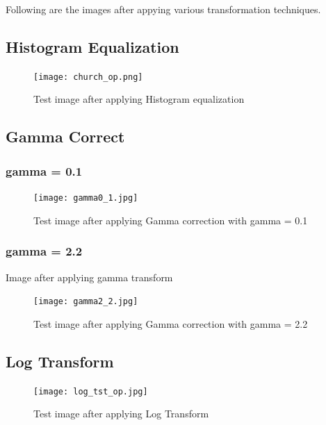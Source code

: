 \documentclass{article}
\begin{document}
Following are the images after appying various transformation techniques.
\subsection{Histogram Equalization}
\begin{figure}[htb]

\begin{minipage}[b]{1.0\linewidth}
  \centering
  \centerline{\texttt{[image: church\_op.png]}}
  \centerline{Test image after applying Histogram equalization}\medskip
\end{minipage}
%
\end{figure}


\subsection{Gamma Correct}
\subsubsection{gamma = 0.1}
\begin{figure}[htb]

\begin{minipage}[b]{1.0\linewidth}
  \centering
  \centerline{\texttt{[image: gamma0\_1.jpg]}}
  \centerline{Test image after applying Gamma correction with gamma = 0.1}\medskip
\end{minipage}
%
\end{figure}
\subsubsection[h]{gamma = 2.2}Image after applying gamma transform
\begin{figure}[h]

\begin{minipage}[b]{1.0\linewidth}
  \centering
  \centerline{\texttt{[image: gamma2\_2.jpg]}}
  \centerline{Test image after applying Gamma correction with gamma = 2.2}\medskip
\end{minipage}
%
\end{figure}


\subsection[h]{Log Transform}
\begin{figure}[!h]

\begin{minipage}[b]{1.0\linewidth}
  \centering
  \centerline{\texttt{[image: log\_tst\_op.jpg]}}
  \centerline{Test image after applying Log Transform}\medskip
\end{minipage}
%
\end{figure}
\end{document}
